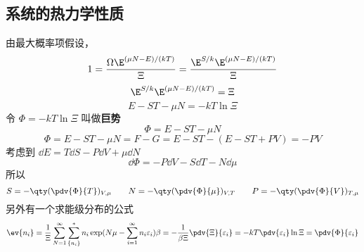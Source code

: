 \subsection{系统的热力学性质}
由最大概率项假设，
\begin{equation}
1 = \frac{\Omega \E^{(\mu N - E)/(kT)}}{\Xi}
= \frac{\E^{S/k} \E^{(\mu N - E)/(kT)}}{\Xi}
\end{equation}
\begin{equation}
\E^{S/k} \E^{(\mu N - E)/(kT)} = \Xi
\end{equation}
\begin{equation} 
E - ST - \mu N =  - kT\ln \Xi
\end{equation}
令 $\Phi  =  - kT\ln \Xi $ 叫做\textbf{巨势}
\begin{equation}
\Phi  = E - ST - \mu N
\end{equation}
\begin{equation}
\Phi  = E - ST - \mu N = F - G = E - ST - (E - ST + PV) =  - PV
\end{equation}
考虑到 $\dd{E} = T\dd{S} - P\dd{V} + \mu \dd{N}$
\begin{equation}
\dd{\Phi} = -P\dd{V} - S\dd{T} - N\dd{\mu}
\end{equation}
所以
\begin{equation}
S = -\qty(\pdv{\Phi}{T})_{V,\mu } \qquad 
N = - \qty(\pdv{\Phi}{\mu})_{V,T} \qquad
P = - \qty(\pdv{\Phi}{V})_{T,\mu}
\end{equation}
另外有一个求能级分布的公式
\begin{equation}
\ev{n_i} = \frac{1}{\Xi} \sum_{N=1}^\infty \sum_{\{n_i\}}^* n_i \exp(N\mu - \sum_{i=1}^\infty n_i \varepsilon_i)\beta = -\frac{1}{\beta \Xi } \pdv{\Xi}{\varepsilon_i} =  - kT \pdv{\varepsilon_i} \ln \Xi  = \pdv{\Phi}{\varepsilon_i}
\end{equation}